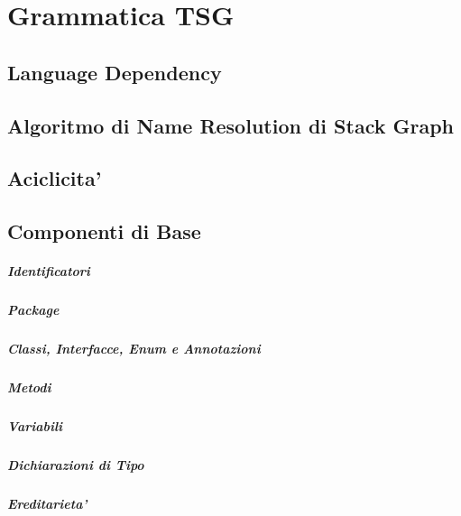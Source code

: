 \chapter{Grammatica TSG}

\section{Language Dependency}

\section{Algoritmo di Name Resolution di Stack Graph}

\section{Aciclicita'}

\section{Componenti di Base}

\paragraph{Identificatori}

\paragraph{Package}

\paragraph{Classi, Interfacce, Enum e Annotazioni}

\paragraph{Metodi}

\paragraph{Variabili}

\paragraph{Dichiarazioni di Tipo}

\paragraph{Ereditarieta'}

